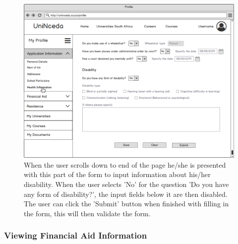 \documentclass[a4paper, 12pt]{article}
\begin{document}
\begin{figure}[H]
\centering

\includegraphics[scale=0.5]{ProfileAppInfoHealthInformationPage2}
\caption{When the user scrolls down to end of the page he/she is presented with this part of the form to input information about his/her disability. When the user selects 'No' for the question 'Do you have any form of disability?', the input fields below it are then disabled. The user can click the 'Submit' button when finished with filling in the form, this will then validate the form. }
\label{ProfileAppInfoHealthInformationPage2}


\end{figure}

\newpage
\subsubsection{Viewing Financial Aid Information}

\setcounter{figure}{0}
\end{document}
